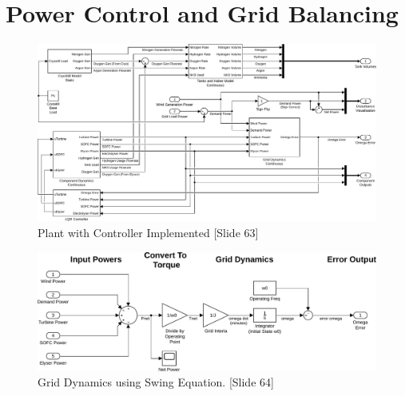 \section{Power Control and Grid Balancing}




\begin{figure}[H]
\centering
        \includegraphics[scale=0.6]{images/plant2/plant.pdf}
    \caption{Plant with Controller Implemented [Slide 63]}
        \label{fig:plant}
\end{figure}

\begin{figure}[H]
\centering
        \includegraphics[scale=0.65]{images/plant2/grid.pdf}
    \caption{Grid Dynamics using Swing Equation. [Slide 64]}
        \label{fig:grid}
\end{figure}

